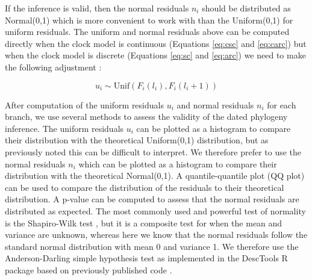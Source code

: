 \documentclass{article}
\begin{document}
If the inference is valid, then the normal residuals $n_i$ should be distributed
as Normal(0,1) which is more convenient to work with than the Uniform(0,1) for uniform residuals.
The uniform and normal residuals above can be computed directly
when the clock model is continuous (Equations \ref{eq:csc} and \ref{eq:carc}) but when
the clock model is discrete (Equations \ref{eq:sc} and \ref{eq:arc}) we need to make the following
adjustment \citep{dunnRandomizedQuantileResiduals1996,brockwellUniversalResidualsMultivariate2007,lauNewModelDiagnostics2014}:

\begin{equation}
u_i \sim \mathrm{Unif}(F_i(l_i),F_i(l_i+1))
\label{eq:unif-resid-discrete}
\end{equation}

After computation of the uniform residuals $u_i$ and normal residuals $n_i$ for each branch,
we use several methods to assess the validity of the dated phylogeny inference.
The uniform residuals $u_i$ can be plotted as a histogram to compare their
distribution with the theoretical Uniform(0,1) distribution, but as previously noted this can
be difficult to interpret. We therefore prefer to use the normal residuals $n_i$ which can be plotted
as a histogram to compare their distribution with the theoretical Normal(0,1).
A quantile-quantile plot (QQ plot) can be used to compare the distribution of the residuals
to their theoretical distribution.
A p-value can be computed to assess that the normal
residuals are distributed as expected. 
The most commonly used and powerful test of normality 
is the Shapiro-Wilk test \citep{razaliPowerComparisonsShapiroWilk2011},
but it is a composite test for when the mean and variance
are unknown, whereas here we know that the
normal residuals follow the standard normal distribution with
mean 0 and variance 1. We therefore use the
Anderson-Darling simple hypothesis 
test \citep{lewis1961distribution} 
as implemented in the DescTools R package
based on previously published code
\citep{marsagliaEvaluatingAndersonDarlingDistribution2004}. 
\end{document}
